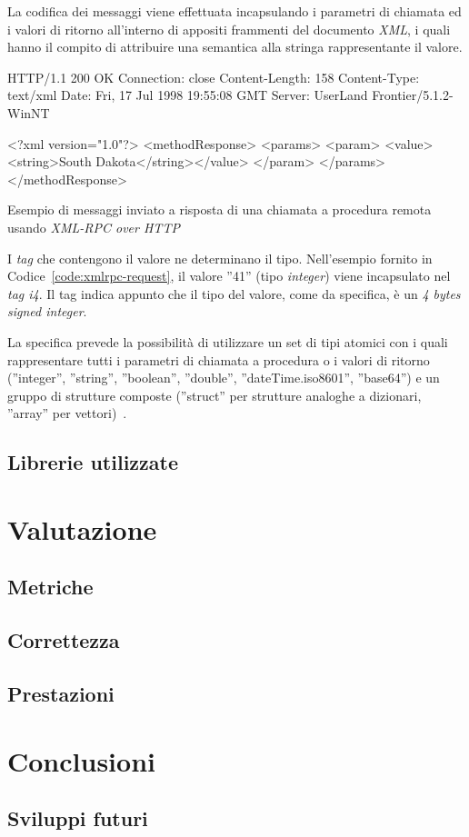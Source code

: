 La codifica dei messaggi viene effettuata incapsulando i parametri di chiamata ed i valori di ritorno all'interno di appositi frammenti del documento \emph{XML}, i quali hanno il compito di attribuire una semantica alla stringa rappresentante il valore.

\begin{program}
\begin{verbatimtab}
HTTP/1.1 200 OK
Connection: close
Content-Length: 158
Content-Type: text/xml
Date: Fri, 17 Jul 1998 19:55:08 GMT
Server: UserLand Frontier/5.1.2-WinNT


<?xml version="1.0"?>
<methodResponse>
   <params>
      <param>
         <value><string>South Dakota</string></value>
         </param>
      </params>
   </methodResponse>
\end{verbatimtab}
\caption{Esempio di messaggi inviato a risposta di una chiamata a procedura remota usando \emph{XML-RPC over HTTP}}\label{code:xmlrpc-response}
\end{program}

I \emph{tag} che contengono il valore ne determinano il tipo. Nell'esempio fornito in Codice~\ref{code:xmlrpc-request}, il valore ''41'' (tipo \emph{integer}) viene incapsulato nel \emph{tag i4}. Il tag indica appunto che il tipo del valore, come da specifica, è un \emph{4 bytes signed integer}.

La specifica prevede la possibilità di utilizzare un set di tipi atomici con i quali rappresentare tutti i parametri di chiamata a procedura o i valori di ritorno (''integer'', ''string'', ''boolean'', ''double'', ''dateTime.iso8601'', ''base64'') e un gruppo di strutture composte (''struct'' per strutture analoghe a dizionari, ''array'' per vettori)~\cite{xmlrpcspec}.


\subsection{Librerie utilizzate}


\section{Valutazione}

\subsection{Metriche}

\subsection{Correttezza}

\subsection{Prestazioni}


\section{Conclusioni}

\subsection{Sviluppi futuri}
